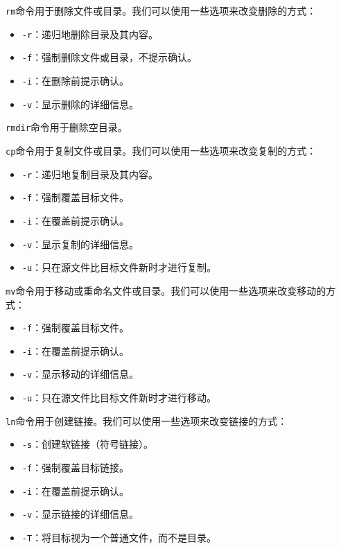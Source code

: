 \documentclass[../main.tex]{subfiles}
\begin{document}
\texttt{rm}命令用于删除文件或目录。我们可以使用一些选项来改变删除的方式：
\begin{itemize}
    \item \texttt{-r}：递归地删除目录及其内容。
    \item \texttt{-f}：强制删除文件或目录，不提示确认。
    \item \texttt{-i}：在删除前提示确认。
    \item \texttt{-v}：显示删除的详细信息。
\end{itemize}

\texttt{rmdir}命令用于删除空目录。

\texttt{cp}命令用于复制文件或目录。我们可以使用一些选项来改变复制的方式：
\begin{itemize}
    \item \texttt{-r}：递归地复制目录及其内容。
    \item \texttt{-f}：强制覆盖目标文件。
    \item \texttt{-i}：在覆盖前提示确认。
    \item \texttt{-v}：显示复制的详细信息。
    \item \texttt{-u}：只在源文件比目标文件新时才进行复制。
\end{itemize}

\texttt{mv}命令用于移动或重命名文件或目录。我们可以使用一些选项来改变移动的方式：
\begin{itemize}
    \item \texttt{-f}：强制覆盖目标文件。
    \item \texttt{-i}：在覆盖前提示确认。
    \item \texttt{-v}：显示移动的详细信息。
    \item \texttt{-u}：只在源文件比目标文件新时才进行移动。
\end{itemize}

\texttt{ln}命令用于创建链接。我们可以使用一些选项来改变链接的方式：
\begin{itemize}
    \item \texttt{-s}：创建软链接（符号链接）。
    \item \texttt{-f}：强制覆盖目标链接。
    \item \texttt{-i}：在覆盖前提示确认。
    \item \texttt{-v}：显示链接的详细信息。
    \item \texttt{-T}：将目标视为一个普通文件，而不是目录。
\end{itemize}
\end{document}
